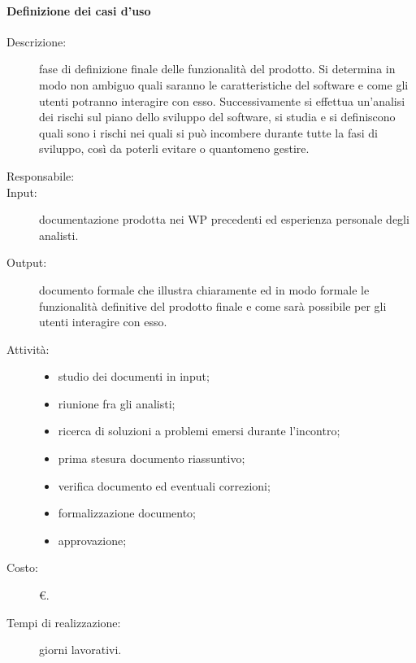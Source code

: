 \paragraph{Definizione dei casi d'uso}
\begin{description}
\item[Descrizione:]fase di definizione finale delle funzionalità del prodotto. Si determina in modo non ambiguo quali saranno le caratteristiche del software e come gli utenti potranno interagire con esso. Successivamente si effettua un'analisi dei rischi sul piano dello sviluppo del software, si studia e si definiscono quali sono i rischi nei quali si può incombere durante tutte la fasi di sviluppo, così da poterli evitare o quantomeno gestire.
\item[Responsabile:] 
\item[Input: ]documentazione prodotta nei WP precedenti ed esperienza personale degli analisti.
\item[Output:] documento formale che illustra chiaramente ed in modo formale le funzionalità definitive del prodotto finale e come sarà possibile per gli utenti interagire con esso.
\item[Attività:]
\begin{itemize}
\item studio dei documenti in input;
\item riunione fra gli analisti;
\item ricerca di soluzioni a problemi emersi durante l'incontro;
\item prima stesura documento riassuntivo;
\item verifica documento ed eventuali correzioni;
\item formalizzazione documento;
\item approvazione;
\end{itemize}
\item[Costo:] \euro{}.
\item[Tempi di realizzazione:]  giorni lavorativi.
\end{description}

